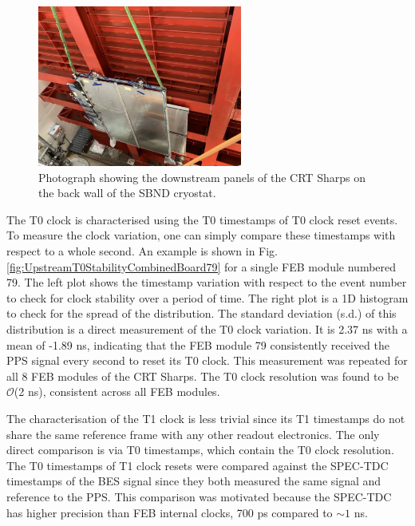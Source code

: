 \begin{figure}[htbp!] 
\centering    
\includegraphics[width=0.6\textwidth]{crt_sharps}
\caption[CRT Sharps Photograph]{
Photograph showing the downstream panels of the CRT Sharps on the back wall of the SBND cryostat. 
}
\label{fig:crtSharps}
\end{figure}


The T0 clock is characterised using the T0 timestamps of T0 clock reset events.
To measure the clock variation, one can simply compare these timestamps with respect to a whole second.
An example is shown in Fig. \ref{fig:UpstreamT0StabilityCombinedBoard79} for a single FEB module numbered 79.
The left plot shows the timestamp variation with respect to the event number to check for clock stability over a period of time.
The right plot is a 1D histogram to check for the spread of the distribution.
The standard deviation (s.d.) of this distribution is a direct measurement of the T0 clock variation.
It is 2.37 ns with a mean of -1.89 ns, indicating that the FEB module 79 consistently received the PPS signal every second to reset its T0 clock.
This measurement was repeated for all 8 FEB modules of the CRT Sharps.
The T0 clock resolution was found to be $\mathcal{O}$(2 ns), consistent across all FEB modules.

The characterisation of the T1 clock is less trivial since its T1 timestamps do not share the same reference frame with any other readout electronics.
The only direct comparison is via T0 timestamps, which contain the T0 clock resolution. 
The T0 timestamps of T1 clock resets were compared against the SPEC-TDC timestamps of the BES signal since they both measured the same signal and reference to the PPS.
This comparison was motivated because the SPEC-TDC has higher precision than FEB internal clocks, 700 ps compared to $\sim 1$ ns.

